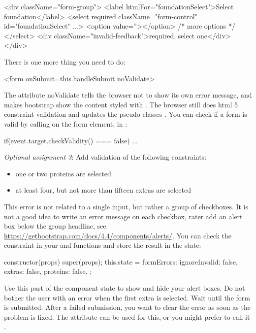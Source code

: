 \documentclass[fleqn, article, a4paper]{memoir}
\begin{document}
\begin{Assignments}
\begin{Code}
<div className="form-group">
  <label htmlFor="foundationSelect">Select foundation</label>
  <select required className="form-control" id="foundationSelect" ...>
    <option value=''></option>
    {/* more options */}
  </select>
  <div className="invalid-feedback">required, select one</div>
</div>
\end{Code}
There is one more thing you need to do:
\begin{Code}
<form onSubmit={this.handleSubmit} noValidate>
\end{Code}
The attribute noValidate tells the browser not to show its own error message, and makes bootstrap show the content styled with . The browser still does html 5 constraint validation and updates the pseudo classes . You can check if a form is valid by calling  on the form element, in :
\begin{Code}
if(event.target.checkValidity() === false){ ... }
\end{Code}

\item \emph{Optional assignment 3}: Add validation of the following constraints:
\begin{itemize}
  \item one or two proteins are selected
  \item at least four, but not more than fifteen extras are selected
\end{itemize}
This error is not related to a single input, but rather a group of checkboxes. It is not a good idea to write an error message on each checkbox, rater add an alert box below the group headline, see \url{https://getbootstrap.com/docs/4.4/components/alerts/}. You can check the constraint in your  and  functions and store the result in the state:
\begin{Code}
constructor(props) {
  super(props);
  this.state = {
    formErrors: {
      ignoreInvalid: false,
      extras: false,
      proteins: false,
    }
  };
}
\end{Code}
Use this part of the component state to show and hide your alert boxes. Do not bother the user with an error when the first extra is selected. Wait until the form is submitted. After a failed submission, you want to clear the error as soon as the problem is fixed. The attribute  can be used for this, or you might prefer to call it .

\end{Assignments}


\end{document}
